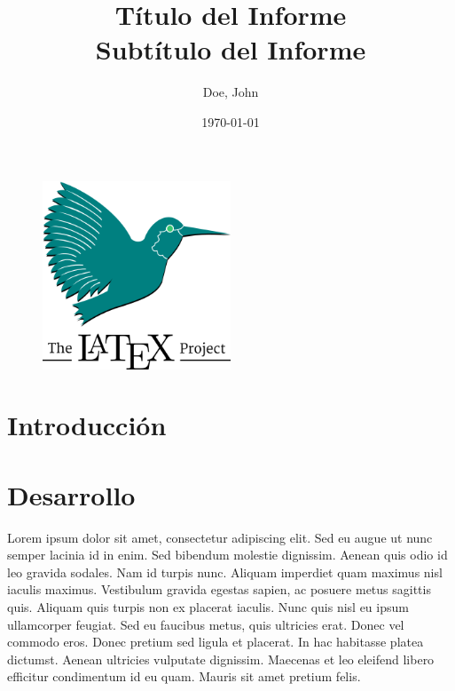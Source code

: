 \documentclass[12pt]{article}
\begin{document}
\title{\textbf{Título del Informe} \\ \large \textbf{Subtítulo del Informe}}
\author{Doe, John}
\date{\today}

\maketitle %

\begin{figure}[htbp]
    \centering
    \includegraphics[width=0.5\textwidth]{../assets/latex.png}
\end{figure}

\newpage
\thispagestyle{empty}
\tableofcontents
\newpage

\section{Introducción}



\section{Desarrollo}

Lorem ipsum dolor sit amet, consectetur adipiscing elit. 
Sed eu augue ut nunc semper lacinia id in enim. Sed bibendum 
molestie dignissim. Aenean quis odio id leo gravida sodales. 
Nam id turpis nunc. Aliquam imperdiet quam maximus nisl 
iaculis maximus. Vestibulum gravida egestas sapien, ac posuere 
metus sagittis quis. Aliquam quis turpis non ex placerat iaculis. 
Nunc quis nisl eu ipsum ullamcorper feugiat. Sed eu faucibus metus, 
quis ultricies erat. Donec vel commodo eros. Donec pretium sed 
ligula et placerat. In hac habitasse platea dictumst. 
Aenean ultricies vulputate dignissim. Maecenas et leo eleifend 
libero efficitur condimentum id eu quam. Mauris sit amet pretium felis.
\end{document}
